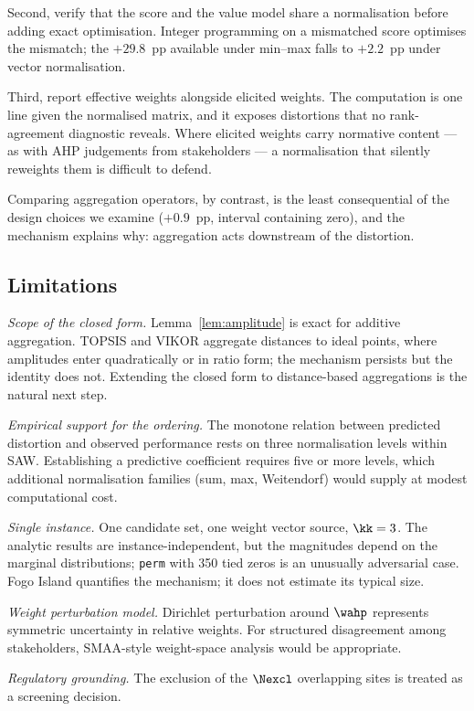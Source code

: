 Second, verify that the score and the value model share a normalisation
before adding exact optimisation.
Integer programming on a mismatched score optimises the mismatch; the
$+29.8$~pp available under min--max falls to $+2.2$~pp under vector
normalisation.

Third, report effective weights alongside elicited weights.
The computation is one line given the normalised matrix, and it exposes
distortions that no rank-agreement diagnostic reveals.
Where elicited weights carry normative content --- as with AHP judgements
from stakeholders --- a normalisation that silently reweights them is
difficult to defend.

Comparing aggregation operators, by contrast, is the least consequential
of the design choices we examine ($+0.9$~pp, interval containing zero),
and the mechanism explains why: aggregation acts downstream of the
distortion.

\subsection{Limitations}

\emph{Scope of the closed form.}
Lemma~\ref{lem:amplitude} is exact for additive aggregation.
TOPSIS and VIKOR aggregate distances to ideal points, where amplitudes
enter quadratically or in ratio form; the mechanism persists but the
identity does not.
Extending the closed form to distance-based aggregations is the natural
next step.

\emph{Empirical support for the ordering.}
The monotone relation between predicted distortion and observed
performance rests on three normalisation levels within SAW.
Establishing a predictive coefficient requires five or more levels, which
additional normalisation families (sum, max, Weitendorf) would supply at
modest computational cost.

\emph{Single instance.}
One candidate set, one weight vector source, $\kk=3$.
The analytic results are instance-independent, but the magnitudes depend
on the marginal distributions; \texttt{perm} with 350 tied zeros is an
unusually adversarial case.
Fogo Island quantifies the mechanism; it does not estimate its typical
size.

\emph{Weight perturbation model.}
Dirichlet perturbation around $\wahp$ represents symmetric uncertainty in
relative weights.
For structured disagreement among stakeholders,
SMAA-style weight-space analysis \citep{Lahdelma2001} would be
appropriate.

\emph{Regulatory grounding.}
The exclusion of the $\Nexcl$ overlapping sites is treated as a
screening decision.
